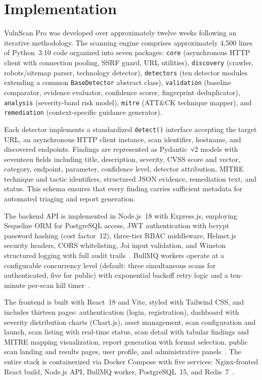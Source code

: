 \documentclass[conference]{IEEEtran}
\begin{document}
\section{Implementation}

VulnScan Pro was developed over approximately twelve weeks following an iterative methodology. The scanning engine comprises approximately 4,500 lines of Python~3.10 code organized into seven packages: \texttt{core} (asynchronous HTTP client with connection pooling, SSRF guard, URL utilities), \texttt{discovery} (crawler, robots/sitemap parser, technology detector), \texttt{detectors} (ten detector modules extending a common \texttt{BaseDetector} abstract class), \texttt{validation} (baseline comparator, evidence evaluator, confidence scorer, fingerprint deduplicator), \texttt{analysis} (severity-band risk model), \texttt{mitre} (ATT\&CK technique mapper), and \texttt{remediation} (context-specific guidance generator).

Each detector implements a standardized \texttt{detect()} interface accepting the target URL, an asynchronous HTTP client instance, scan identifier, hostname, and discovered endpoints. Findings are represented as Pydantic~v2 models with seventeen fields including title, description, severity, CVSS score and vector, category, endpoint, parameter, confidence level, detector attribution, MITRE technique and tactic identifiers, structured JSON evidence, remediation text, and status. This schema ensures that every finding carries sufficient metadata for automated triaging and report generation.

The backend API is implemented in Node.js~18 with Express.js, employing Sequelize ORM for PostgreSQL access, JWT authentication with bcrypt password hashing (cost factor~12), three-tier RBAC middleware, Helmet.js security headers, CORS whitelisting, Joi input validation, and Winston structured logging with full audit trails~\cite{jwt2015, rbac2001, bcrypt1999}. BullMQ workers operate at a configurable concurrency level (default: three simultaneous scans for authenticated, five for public) with exponential backoff retry logic and a ten-minute per-scan kill timer~\cite{bullmqdocs}.

The frontend is built with React~18 and Vite, styled with Tailwind CSS, and includes thirteen pages: authentication (login, registration), dashboard with severity distribution charts (Chart.js), asset management, scan configuration and launch, scan listing with real-time status, scan detail with tabular findings and MITRE mapping visualization, report generation with format selection, public scan landing and results pages, user profile, and administrative panels~\cite{react2023}. The entire stack is containerized via Docker Compose with five services: Nginx-fronted React build, Node.js API, BullMQ worker, PostgreSQL~15, and Redis~7~\cite{dockersec2019, postgresql2023}.
\end{document}
